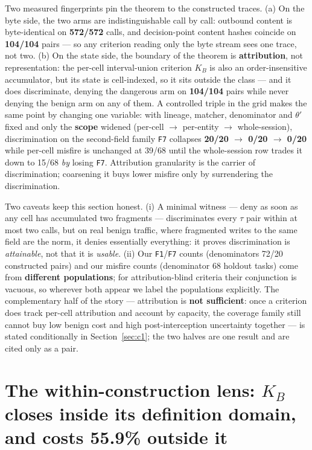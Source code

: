 \documentclass[preprint,12pt]{elsarticle}
\begin{document}
Two measured fingerprints pin the theorem to the constructed traces. (a) On the byte side, the two
arms are indistinguishable call by call: outbound content is byte-identical on \textbf{572/572}
calls, and decision-point content hashes coincide on \textbf{104/104} pairs --- so any criterion
reading only the byte stream sees one trace, not two. (b) On the state side, the boundary of the
theorem is \textbf{attribution}, not representation: the per-cell interval-union criterion $K_B$
is also an order-insensitive accumulator, but its state is cell-indexed, so it sits outside the
class --- and it does discriminate, denying the dangerous arm on \textbf{104/104} pairs while
never denying the benign arm on any of them. A controlled triple in the grid makes the same point
by changing one variable: with lineage, matcher, denominator and $\theta'$ fixed and only the
\textbf{scope} widened (per-cell $\rightarrow$ per-entity $\rightarrow$ whole-session),
discrimination on the second-field family \texttt{F7} collapses \textbf{20/20 $\rightarrow$ 0/20
$\rightarrow$ 0/20} while per-cell misfire is unchanged at 39/68 until the whole-session row trades
it down to 15/68 \emph{by} losing \texttt{F7}. Attribution granularity is the carrier of
discrimination; coarsening it buys lower misfire only by surrendering the discrimination.

Two caveats keep this section honest. (i) A minimal witness --- deny as soon as any cell has
accumulated two fragments --- discriminates every $\tau$ pair within at most two calls, but on real
benign traffic, where fragmented writes to the same field are the norm, it denies essentially
everything: it proves discrimination is \emph{attainable}, not that it is \emph{usable}. (ii) Our
\texttt{F1}/\texttt{F7} counts (denominators 72/20 constructed pairs) and our misfire counts
(denominator 68 holdout tasks) come from \textbf{different populations}; for attribution-blind
criteria their conjunction is vacuous, so wherever both appear we label the populations
explicitly. The complementary half of the story --- attribution is \textbf{not sufficient}: once a
criterion does track per-cell attribution and account by capacity, the coverage family still cannot
buy low benign cost and high post-interception uncertainty together --- is stated conditionally in
Section~\ref{sec:c1}; the two halves are one result and are cited only as a pair.

\section{The within-construction lens: \texorpdfstring{$K_B$}{K\_B} closes inside its definition
domain, and costs 55.9\% outside it}\label{sec:lens}
\end{document}
